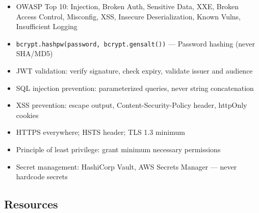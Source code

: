 \documentclass[11pt, a4paper, oneside]{report}
\begin{document}
\begin{cheatsheetbox}
\begin{itemize}[leftmargin=*]
\item OWASP Top 10: Injection, Broken Auth, Sensitive Data, XXE, Broken Access Control, Misconfig, XSS, Insecure Deserialization, Known Vulns, Insufficient Logging
\item \texttt{bcrypt.hashpw(password, bcrypt.gensalt())} --- Password hashing (never SHA/MD5)
\item JWT validation: verify signature, check expiry, validate issuer and audience
\item SQL injection prevention: parameterized queries, never string concatenation
\item XSS prevention: escape output, Content-Security-Policy header, httpOnly cookies
\item HTTPS everywhere; HSTS header; TLS 1.3 minimum
\item Principle of least privilege: grant minimum necessary permissions
\item Secret management: HashiCorp Vault, AWS Secrets Manager --- never hardcode secrets
\end{itemize}
\end{cheatsheetbox}

\subsection*{Resources}
\end{document}
